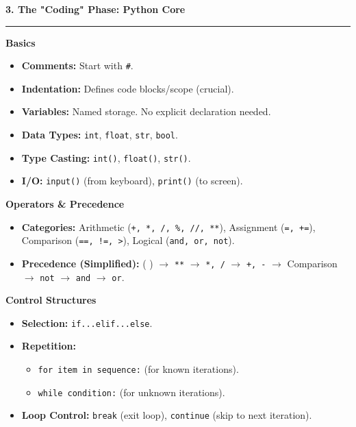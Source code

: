 \documentclass[a4paper, 8pt]{extarticle}
\newcommand{\sectionheading}[1]{\large\textbf{#1}\par\noindent\rule{\linewidth}{0.4pt}}
\newcommand{\subsectionheading}[1]{\normalsize\textbf{#1}}
\begin{document}
\begin{multicols}{2}

\sectionheading{3. The "Coding" Phase: Python Core}
\vspace{0.5em}
\subsectionheading{Basics}
\begin{itemize}
    \item \textbf{Comments:} Start with \texttt{\#}.
    \item \textbf{Indentation:} Defines code blocks/scope (crucial).
    \item \textbf{Variables:} Named storage. No explicit declaration needed.
    \item \textbf{Data Types:} \texttt{int}, \texttt{float}, \texttt{str}, \texttt{bool}.
    \item \textbf{Type Casting:} \texttt{int()}, \texttt{float()}, \texttt{str()}.
    \item \textbf{I/O:} \texttt{input()} (from keyboard), \texttt{print()} (to screen).
\end{itemize}
\subsectionheading{Operators & Precedence}
\begin{itemize}
    \item \textbf{Categories:} Arithmetic (\texttt{+, *, /, \%, //, **}), Assignment (\texttt{=, +=}), Comparison (\texttt{==, !=, >}), Logical (\texttt{and, or, not}).
    \item \textbf{Precedence (Simplified):} ( ) $\rightarrow$ \texttt{**} $\rightarrow$ \texttt{*, /} $\rightarrow$ \texttt{+, -} $\rightarrow$ Comparison $\rightarrow$ \texttt{not} $\rightarrow$ \texttt{and} $\rightarrow$ \texttt{or}.
\end{itemize}
\subsectionheading{Control Structures}
\begin{itemize}
    \item \textbf{Selection:} \texttt{if...elif...else}.
    \item \textbf{Repetition:}
    \begin{itemize}
        \item \texttt{for item in sequence:} (for known iterations).
        \item \texttt{while condition:} (for unknown iterations).
    \end{itemize}
    \item \textbf{Loop Control:} \texttt{break} (exit loop), \texttt{continue} (skip to next iteration).
\end{itemize}


\end{multicols}
\end{document}
